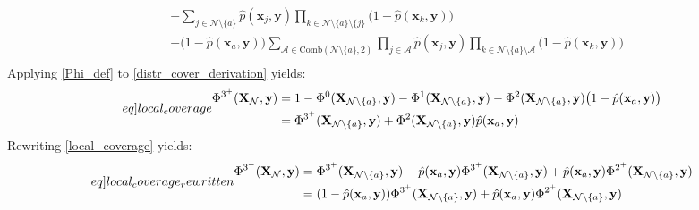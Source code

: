 \begin{appendices}
\begin{equation}
\begin{split}
      &- \sum_{j\in\mathcal{N}\setminus\{a\}}\hat{p}(\mathbf{x}_{j}, \mathbf{y})\prod_{k\in\mathcal{N}\setminus\{a\}\setminus\{j\}}\big(1-\hat{p}(\mathbf{x}_{k}, \mathbf{y})\big)\\
      &- \big(1-\hat{p}(\mathbf{x}_{a}, \mathbf{y})\big)\sum_{\mathcal{A}\in \mathrm{Comb}(\mathcal{N}\setminus\{a\}, 2)}\prod_{j\in\mathcal{A}}\hat{p}(\mathbf{x}_{j}, \mathbf{y})\prod_{k\in\mathcal{N}\setminus\{a\}\setminus\mathcal{A}}\big(1-\hat{p}(\mathbf{x}_{k}, \mathbf{y})\big)\\
    \end{split}
  \end{equation}
  Applying \eqref{Phi_def} to \eqref{distr_cover_derivation} yields:
  \begin{equation}\label[eq]{local_coverage}
    \begin{split}
      \Phi^{3^{+}}(\mathbf{X}_{\mathcal{N}}, \mathbf{y}) &= 1 - \Phi^{0}(\mathbf{X}_{\mathcal{N}\setminus\{a\}}, \mathbf{y}) - \Phi^{1}(\mathbf{X}_{\mathcal{N}\setminus\{a\}}, \mathbf{y}) - \Phi^{2}(\mathbf{X}_{\mathcal{N}\setminus\{a\}}, \mathbf{y})\big(1-\hat{p}(\mathbf{x}_{a}, \mathbf{y})\big)\\
      &= \Phi^{3^{+}}(\mathbf{X}_{\mathcal{N}\setminus\{a\}}, \mathbf{y}) + \Phi^{2}(\mathbf{X}_{\mathcal{N}\setminus\{a\}}, \mathbf{y})\hat{p}(\mathbf{x}_{a}, \mathbf{y})\\
    \end{split}
  \end{equation}
  Rewriting \eqref{local_coverage} yields:
  \begin{equation}\label[eq]{local_coverage_rewritten}
    \begin{split}
      \Phi^{3^{+}}(\mathbf{X}_{\mathcal{N}}, \mathbf{y}) &= \Phi^{3^{+}}(\mathbf{X}_{\mathcal{N}\setminus\{a\}}, \mathbf{y}) - \hat{p}(\mathbf{x}_{a}, \mathbf{y})\Phi^{3^{+}}(\mathbf{X}_{\mathcal{N}\setminus\{a\}}, \mathbf{y}) + \hat{p}(\mathbf{x}_{a}, \mathbf{y})\Phi^{2^{+}}(\mathbf{X}_{\mathcal{N}\setminus\{a\}}, \mathbf{y})\\
      &= (1-\hat{p}(\mathbf{x}_{a}, \mathbf{y}))\Phi^{3^{+}}(\mathbf{X}_{\mathcal{N}\setminus\{a\}}, \mathbf{y}) + \hat{p}(\mathbf{x}_{a}, \mathbf{y})\Phi^{2^{+}}(\mathbf{X}_{\mathcal{N}\setminus\{a\}}, \mathbf{y})\\
    \end{split}
  \end{equation}
  \resumetocwriting
\end{appendices}